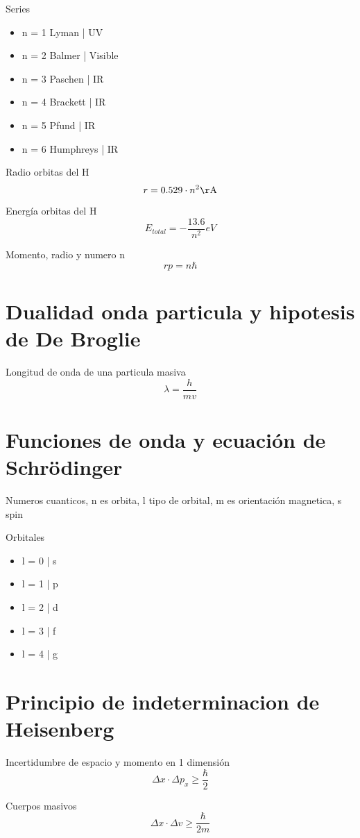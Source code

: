\documentclass[12pt, letterpaper, twoside]{article}
\begin{document}
	Series
	\begin{itemize}
		\item n = 1 Lyman | UV
		\item n = 2 Balmer | Visible
		\item n = 3 Paschen | IR
		\item n = 4 Brackett | IR
		\item n = 5 Pfund | IR
		\item n = 6 Humphreys | IR
	\end{itemize}

	Radio orbitas del H
	\begin{equation}
		r = 0.529 \cdot n^2 \si{\AA}
	\end{equation}

	Energía orbitas del H
	\begin{equation}
		E_{total} = - \frac{13.6}{n^2} \si{eV}
	\end{equation}

	Momento, radio y numero n
	\begin{equation}
		rp = n \hbar
	\end{equation}

	\section{Dualidad onda particula y hipotesis de De Broglie}
	
	Longitud de onda de una particula masiva
	\begin{equation}
		\lambda = \frac{h}{mv}
	\end{equation}


	\section{Funciones de onda y ecuación de Schrödinger}
	Numeros cuanticos, n es orbita, l tipo de orbital, m es orientación magnetica, s spin

	Orbitales
	\begin{itemize}
		\item l = 0 | s
		\item l = 1 | p
		\item l = 2 | d
		\item l = 3 | f
		\item l = 4 | g
	\end{itemize}

	\section{Principio de indeterminacion de Heisenberg}
	
	Incertidumbre de espacio y momento en 1 dimensión
	\begin{equation}
		\Delta x \cdot \Delta p_x \geq \frac{\hbar}{2}
	\end{equation}

	Cuerpos masivos
	\begin{equation}
		\Delta x \cdot \Delta v \geq \frac{\hbar}{2m}
	\end{equation}
\end{document}
